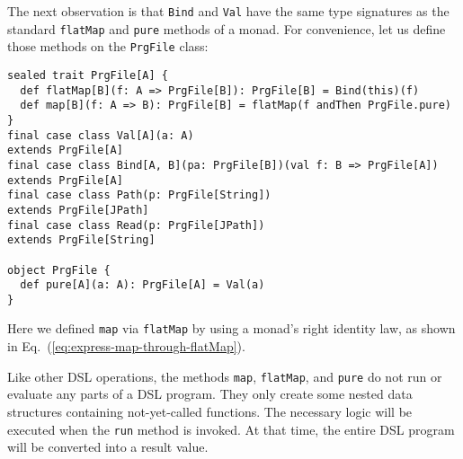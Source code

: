The next observation is that \lstinline!Bind!
and \lstinline!Val! have
the same type signatures as the standard \lstinline!flatMap!
and \lstinline!pure! methods
of a monad. For convenience, let us define those methods on the \lstinline!PrgFile!
class:
\begin{lstlisting}
sealed trait PrgFile[A] {
  def flatMap[B](f: A => PrgFile[B]): PrgFile[B] = Bind(this)(f)
  def map[B](f: A => B): PrgFile[B] = flatMap(f andThen PrgFile.pure)
}
final case class Val[A](a: A)                                       extends PrgFile[A]
final case class Bind[A, B](pa: PrgFile[B])(val f: B => PrgFile[A]) extends PrgFile[A]
final case class Path(p: PrgFile[String])                           extends PrgFile[JPath]
final case class Read(p: PrgFile[JPath])                            extends PrgFile[String]

object PrgFile {
  def pure[A](a: A): PrgFile[A] = Val(a) 
}
\end{lstlisting}
Here we defined \lstinline!map!
via \lstinline!flatMap!
by using a monad\textsf{'}s right identity law, as shown in Eq.~(\ref{eq:express-map-through-flatMap}).

Like other DSL operations, the methods \lstinline!map!,
\lstinline!flatMap!, and
\lstinline!pure! do not
run or evaluate any parts of a DSL program. They only create some
nested data structures containing not-yet-called functions. The necessary
logic will be executed when the \lstinline!run!
method is invoked. At that time, the entire DSL program will be converted
into a result value.

